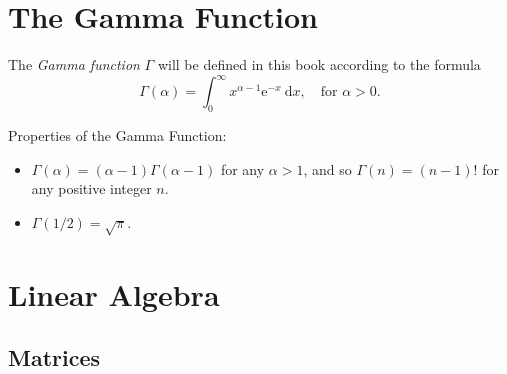 \documentclass[captions=tableheading]{scrbook}
\begin{document}
\begin{example}
\section{The Gamma Function}
\label{sec-21-4}
\label{sec-The-Gamma-Function}


The \emph{Gamma function} \(\Gamma\) will be defined in this book according to the formula
\begin{equation}
\Gamma(\alpha)=\int_{0}^{\infty}x^{\alpha-1}\mathrm{e}^{-x}\:\mathrm{d} x,\quad \mbox{for }\alpha > 0.
\end{equation}

\begin{fact}
Properties of the Gamma Function:
\begin{itemize}
\item \(\Gamma(\alpha)=(\alpha - 1)\Gamma(\alpha - 1)\) for any \(\alpha > 1\), and so \(\Gamma(n)=(n-1)!\) for any positive integer \(n\).
\item \(\Gamma(1/2)=\sqrt{\pi}\).
\end{itemize}

\end{fact}
\section{Linear Algebra}
\label{sec-21-5}
\label{sec-Linear-Algebra}
\subsection{Matrices}
\label{sec-21-5-1}


\end{example}
\end{document}
